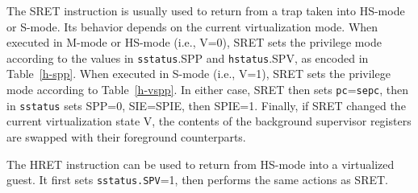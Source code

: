 The SRET instruction is usually used to return from a trap taken into HS-mode or
S-mode.  Its behavior depends on the current virtualization mode.  When
executed in M-mode or HS-mode (i.e., V=0), SRET sets the privilege mode
according to the values in {\tt sstatus}.SPP and {\tt hstatus}.SPV, as encoded
in Table~\ref{h-spp}.  When executed in S-mode (i.e., V=1), SRET sets the
privilege mode according to Table~\ref{h-vspp}.  In either case, SRET then
sets {\tt pc}={\tt sepc}, then in {\tt sstatus} sets SPP=0, SIE=SPIE, then
SPIE=1.  Finally, if SRET changed the current virtualization state V, the
contents of the background supervisor registers are swapped with their
foreground counterparts.

The HRET instruction can be used to return from HS-mode into a virtualized
guest.  It first sets {\tt sstatus.SPV}=1, then performs the same actions as
SRET.
